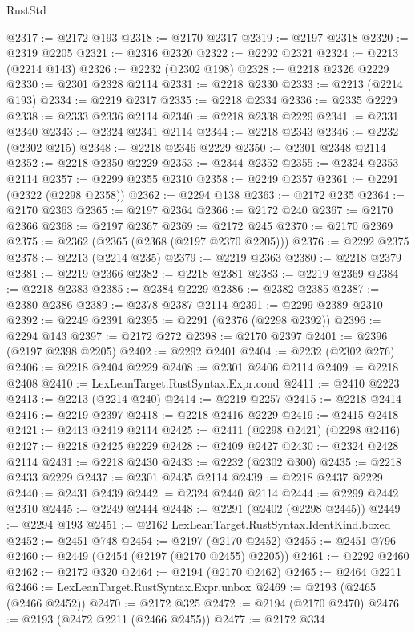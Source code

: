 \begin{lexlean}{RustStd}
\begin{coremodule}
@2317 := @2172 @193
@2318 := @2170 @2317
@2319 := @2197 @2318
@2320 := @2319 @2205
@2321 := @2316 @2320
@2322 := @2292 @2321
@2324 := @2213 (@2214 @143)
@2326 := @2232 (@2302 @198)
@2328 := @2218 @2326 @2229
@2330 := @2301 @2328 @2114
@2331 := @2218 @2330
@2333 := @2213 (@2214 @193)
@2334 := @2219 @2317
@2335 := @2218 @2334
@2336 := @2335 @2229
@2338 := @2333 @2336 @2114
@2340 := @2218 @2338 @2229
@2341 := @2331 @2340
@2343 := @2324 @2341 @2114
@2344 := @2218 @2343
@2346 := @2232 (@2302 @215)
@2348 := @2218 @2346 @2229
@2350 := @2301 @2348 @2114
@2352 := @2218 @2350 @2229
@2353 := @2344 @2352
@2355 := @2324 @2353 @2114
@2357 := @2299 @2355 @2310
@2358 := @2249 @2357
@2361 := @2291 (@2322 (@2298 @2358))
@2362 := @2294 @138
@2363 := @2172 @235
@2364 := @2170 @2363
@2365 := @2197 @2364
@2366 := @2172 @240
@2367 := @2170 @2366
@2368 := @2197 @2367
@2369 := @2172 @245
@2370 := @2170 @2369
@2375 := @2362 (@2365 (@2368 (@2197 @2370 @2205)))
@2376 := @2292 @2375
@2378 := @2213 (@2214 @235)
@2379 := @2219 @2363
@2380 := @2218 @2379
@2381 := @2219 @2366
@2382 := @2218 @2381
@2383 := @2219 @2369
@2384 := @2218 @2383
@2385 := @2384 @2229
@2386 := @2382 @2385
@2387 := @2380 @2386
@2389 := @2378 @2387 @2114
@2391 := @2299 @2389 @2310
@2392 := @2249 @2391
@2395 := @2291 (@2376 (@2298 @2392))
@2396 := @2294 @143
@2397 := @2172 @272
@2398 := @2170 @2397
@2401 := @2396 (@2197 @2398 @2205)
@2402 := @2292 @2401
@2404 := @2232 (@2302 @276)
@2406 := @2218 @2404 @2229
@2408 := @2301 @2406 @2114
@2409 := @2218 @2408
@2410 := LexLeanTarget.RustSyntax.Expr.cond
@2411 := @2410 @2223
@2413 := @2213 (@2214 @240)
@2414 := @2219 @2257
@2415 := @2218 @2414
@2416 := @2219 @2397
@2418 := @2218 @2416 @2229
@2419 := @2415 @2418
@2421 := @2413 @2419 @2114
@2425 := @2411 (@2298 @2421) (@2298 @2416)
@2427 := @2218 @2425 @2229
@2428 := @2409 @2427
@2430 := @2324 @2428 @2114
@2431 := @2218 @2430
@2433 := @2232 (@2302 @300)
@2435 := @2218 @2433 @2229
@2437 := @2301 @2435 @2114
@2439 := @2218 @2437 @2229
@2440 := @2431 @2439
@2442 := @2324 @2440 @2114
@2444 := @2299 @2442 @2310
@2445 := @2249 @2444
@2448 := @2291 (@2402 (@2298 @2445))
@2449 := @2294 @193
@2451 := @2162 LexLeanTarget.RustSyntax.IdentKind.boxed
@2452 := @2451 @748
@2454 := @2197 (@2170 @2452)
@2455 := @2451 @796
@2460 := @2449 (@2454 (@2197 (@2170 @2455) @2205))
@2461 := @2292 @2460
@2462 := @2172 @320
@2464 := @2194 (@2170 @2462)
@2465 := @2464 @2211
@2466 := LexLeanTarget.RustSyntax.Expr.unbox
@2469 := @2193 (@2465 (@2466 @2452))
@2470 := @2172 @325
@2472 := @2194 (@2170 @2470)
@2476 := @2193 (@2472 @2211 (@2466 @2455))
@2477 := @2172 @334

\end{coremodule}
\end{lexlean}
